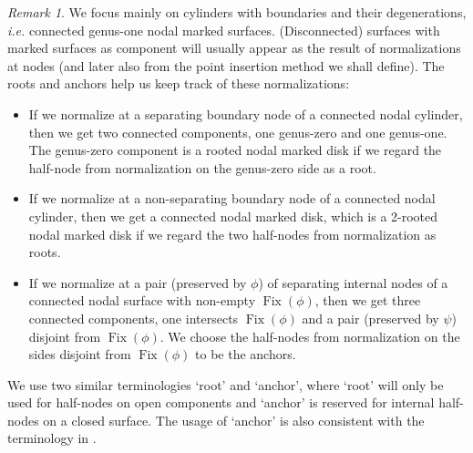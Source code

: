 \documentclass[11pt]{amsart}
\theoremstyle{definition}
\theoremstyle{remark}
\newtheorem{rmk}[dummy]{Remark}
\newcommand{\<}{\left<}
\renewcommand{\>}{\right>}
\numberwithin{equation}{section}
\begin{document}
\begin{rmk}\label{rmk root when degenerate}
We focus mainly on cylinders with boundaries and their degenerations, \textit{i.e.} connected genus-one nodal marked surfaces. (Disconnected) surfaces with marked surfaces as component will usually appear as the result of normalizations at nodes (and later also from the point insertion method we shall define). The roots and anchors help us keep track of these normalizations:
\begin{itemize}
    \item[-]  If we normalize at a separating boundary node of a connected nodal cylinder, then we get two connected components, one genus-zero and one genus-one. The genus-zero component is a rooted nodal marked disk if we regard the half-node from normalization on the genus-zero side as a root.
    \item[-] If we normalize at a non-separating boundary node of a connected nodal cylinder, then we get a connected nodal marked disk, which is a 2-rooted nodal marked disk if we regard the two half-nodes from normalization as roots.
    \item[-]  If we normalize at a pair (preserved by $\phi$) of separating internal nodes of a connected nodal surface with non-empty $\operatorname{Fix}(\phi)$, then we get three connected components, one intersects $\operatorname{Fix}(\phi)$ and a pair (preserved by $\psi$) disjoint from $\operatorname{Fix}(\phi)$. We choose the half-nodes from normalization on the sides disjoint from $\operatorname{Fix}(\phi)$ to be the anchors.
\end{itemize}
We use two similar terminologies `root' and `anchor', where `root' will only be used for half-nodes on open components and `anchor' is reserved for internal half-nodes on a closed surface. The usage of `anchor' is also consistent with the terminology in \cite{BCT1,BCT2,TZ1,TZ2}.

\end{rmk}
\end{document}
